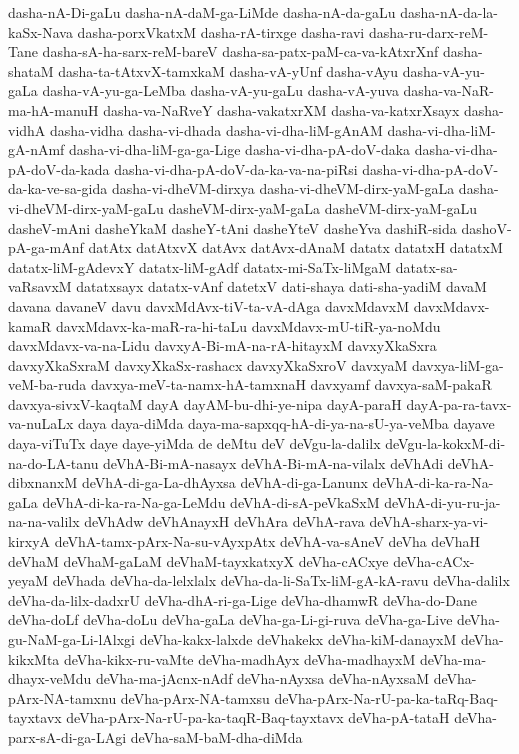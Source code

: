 {dasha-nA-Di-gaLu
dasha-nA-daM-ga-LiMde
dasha-nA-da-gaLu
dasha-nA-da-la-kaSx-Nava
dasha-porxVkatxM
dasha-rA-tirxge
dasha-ravi
dasha-ru-darx-reM-Tane
dasha-sA-ha-sarx-reM-bareV
dasha-sa-patx-paM-ca-va-kAtxrXnf
dasha-shataM
dasha-ta-tAtxvX-tamxkaM
dasha-vA-yUnf
dasha-vAyu
dasha-vA-yu-gaLa
dasha-vA-yu-ga-LeMba
dasha-vA-yu-gaLu
dasha-vA-yuva
dasha-va-NaR-ma-hA-manuH
dasha-va-NaRveY
dasha-vakatxrXM
dasha-va-katxrXsayx
dasha-vidhA
dasha-vidha
dasha-vi-dhada
dasha-vi-dha-liM-gAnAM
dasha-vi-dha-liM-gA-nAmf
dasha-vi-dha-liM-ga-ga-Lige
dasha-vi-dha-pA-doV-daka
dasha-vi-dha-pA-doV-da-kada
dasha-vi-dha-pA-doV-da-ka-va-na-piRsi
dasha-vi-dha-pA-doV-da-ka-ve-sa-gida
dasha-vi-dheVM-dirxya
dasha-vi-dheVM-dirx-yaM-gaLa
dasha-vi-dheVM-dirx-yaM-gaLu
dasheVM-dirx-yaM-gaLa
dasheVM-dirx-yaM-gaLu
dasheV-mAni
dasheYkaM
dasheY-tAni
dasheYteV
dasheYva
dashiR-sida
dashoV-pA-ga-mAnf
datAtx
datAtxvX
datAvx
datAvx-dAnaM
datatx
datatxH
datatxM
datatx-liM-gAdevxY
datatx-liM-gAdf
datatx-mi-SaTx-liMgaM
datatx-sa-vaRsavxM
datatxsayx
datatx-vAnf
datetxV
dati-shaya
dati-sha-yadiM
davaM
davana
davaneV
davu
davxMdAvx-tiV-ta-vA-dAga
davxMdavxM
davxMdavx-kamaR
davxMdavx-ka-maR-ra-hi-taLu
davxMdavx-mU-tiR-ya-noMdu
davxMdavx-va-na-Lidu
davxyA-Bi-mA-na-rA-hitayxM
davxyXkaSxra
davxyXkaSxraM
davxyXkaSx-rashacx
davxyXkaSxroV
davxyaM
davxya-liM-ga-veM-ba-ruda
davxya-meV-ta-namx-hA-tamxnaH
davxyamf
davxya-saM-pakaR
davxya-sivxV-kaqtaM
dayA
dayAM-bu-dhi-ye-nipa
dayA-paraH
dayA-pa-ra-tavx-va-nuLaLx
daya
daya-diMda
daya-ma-sapxqq-hA-di-ya-na-sU-ya-veMba
dayave
daya-viTuTx
daye
daye-yiMda
de
deMtu
deV
deVgu-la-dalilx
deVgu-la-kokxM-di-na-do-LA-tanu
deVhA-Bi-mA-nasayx
deVhA-Bi-mA-na-vilalx
deVhAdi
deVhA-dibxnanxM
deVhA-di-ga-La-dhAyxsa
deVhA-di-ga-Lanunx
deVhA-di-ka-ra-Na-gaLa
deVhA-di-ka-ra-Na-ga-LeMdu
deVhA-di-sA-peVkaSxM
deVhA-di-yu-ru-ja-na-na-valilx
deVhAdw
deVhAnayxH
deVhAra
deVhA-rava
deVhA-sharx-ya-vi-kirxyA
deVhA-tamx-pArx-Na-su-vAyxpAtx
deVhA-va-sAneV
deVha
deVhaH
deVhaM
deVhaM-gaLaM
deVhaM-tayxkatxyX
deVha-cACxye
deVha-cACx-yeyaM
deVhada
deVha-da-lelxlalx
deVha-da-li-SaTx-liM-gA-kA-ravu
deVha-dalilx
deVha-da-lilx-dadxrU
deVha-dhA-ri-ga-Lige
deVha-dhamwR
deVha-do-Dane
deVha-doLf
deVha-doLu
deVha-gaLa
deVha-ga-Li-gi-ruva
deVha-ga-Live
deVha-gu-NaM-ga-Li-lAlxgi
deVha-kakx-lalxde
deVhakekx
deVha-kiM-danayxM
deVha-kikxMta
deVha-kikx-ru-vaMte
deVha-madhAyx
deVha-madhayxM
deVha-ma-dhayx-veMdu
deVha-ma-jAcnx-nAdf
deVha-nAyxsa
deVha-nAyxsaM
deVha-pArx-NA-tamxnu
deVha-pArx-NA-tamxsu
deVha-pArx-Na-rU-pa-ka-taRq-Baq-tayxtavx
deVha-pArx-Na-rU-pa-ka-taqR-Baq-tayxtavx
deVha-pA-tataH
deVha-parx-sA-di-ga-LAgi
deVha-saM-baM-dha-diMda
}
